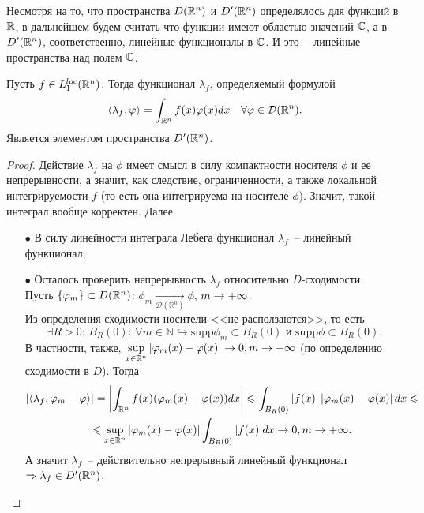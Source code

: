 
\begin{remark}
    Несмотря на то, что пространства $D(\mathbb{R}^n)$ и $D'(\mathbb{R}^n)$ определялось для функций в $\mathbb{R}$, в дальнейшем будем считать что функции имеют областью значений $\mathbb{C}$, а в $D'(\mathbb{R}^n)$, соответственно, линейные функционалы в $\mathbb{C}$.
    И это~-- линейные пространства над полем $\mathbb{C}$.
\end{remark}
\begin{lemma}
    Пусть $f \in L_1^{loc}(\mathbb{R}^n)$.
    Тогда функционал $\lambda_f$, определяемый формулой
    \[
        \langle \lambda_f, \varphi \rangle= \int_{\mathbb{R}^n} f(x) \varphi(x) dx \quad \forall \varphi \in \mathcal{D}(\mathbb{R}^n). \label{lambda_f_functional}
    \]
    Является элементом пространства $D'(\mathbb{R}^n)$.
\end{lemma}
\begin{proof}
    Действие $\lambda_f$ на $\phi$ имеет смысл в силу компактности носителя $\phi$ и ее непрерывности, а значит, как следствие, ограниченности, а также локальной интегрируемости $f$ (то есть она интегрируема на носителе $\phi$). Значит, такой интеграл вообще корректен. Далее
    \begin{enumerate}
        \item[$\bullet$] В силу линейности интеграла Лебега функционал $\lambda_f$~-- линейный функционал;
        \item[$\bullet$] Осталось проверить непрерывность $\lambda_f$ относительно $D$-сходимости: \\
    Пусть $\{\varphi_m\} \subset D(\mathbb{R}^n)$: $\phi_m \xrightarrow[\mathcal{D}(\mathbb{R}^n)]{} \phi$, $m \rightarrow +\infty$.\\
    Из определения сходимости носители <<не расползаются>>, то есть 
    $$\exists R > 0\text{: } B_R(0) \text{: } \forall m \in \mathbb{N} \hookrightarrow \text{supp} \phi_m \subset B_R(0)  \text{ и supp} \phi \subset B_R(0).$$
    В частности, также, $\sup\limits_{x \in \mathbb{R}^n}|\varphi_m(x) - \varphi(x)| \rightarrow 0, m \rightarrow +\infty$ (по определению сходимости в $D$).
    Тогда
    \begin{multline*}
        |\langle \lambda_f, \varphi_m - \varphi \rangle | = \left|\int_{\mathbb{R}^n} f(x)(\varphi_m(x) - \varphi(x))dx\right| \leqslant \int_{B_R(0)} \left|f(x)\right|\left|\varphi_m(x) - \varphi(x)\right| dx \leqslant \\ \leqslant \sup\limits_{x \in \mathbb{R}^n} |\varphi_m (x) - \varphi (x)| \int_{B_R(0)} |f(x)|dx \rightarrow 0, m \rightarrow +\infty.
    \end{multline*}
    А значит $\lambda_f$~-- действительно непрерывный линейный функционал $\Rightarrow \lambda_f \in D'(\mathbb{R}^n)$.
    \end{enumerate}
\end{proof}

